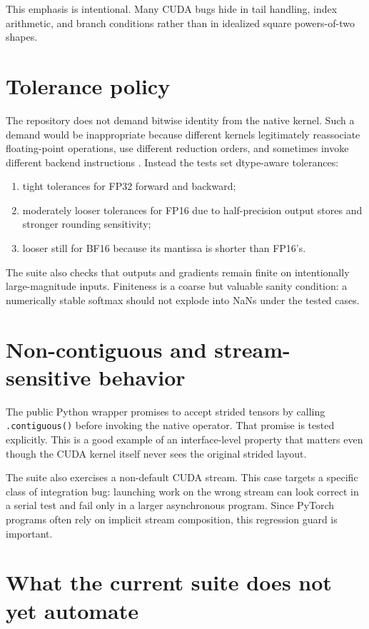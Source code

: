 This emphasis is intentional. Many CUDA bugs hide in tail handling, index arithmetic, and branch conditions rather than in idealized square powers-of-two shapes.

\section{Tolerance policy}

The repository does not demand bitwise identity from the native kernel. Such a demand would be inappropriate because different kernels legitimately reassociate floating-point operations, use different reduction orders, and sometimes invoke different backend instructions \citep{goldberg1991floating,higham2002accuracy,pytorch212numerics}. Instead the tests set dtype-aware tolerances:
\begin{enumerate}
  \item tight tolerances for FP32 forward and backward;
  \item moderately looser tolerances for FP16 due to half-precision output stores and stronger rounding sensitivity;
  \item looser still for BF16 because its mantissa is shorter than FP16's.
\end{enumerate}
The suite also checks that outputs and gradients remain finite on intentionally large-magnitude inputs. Finiteness is a coarse but valuable sanity condition: a numerically stable softmax should not explode into NaNs under the tested cases.

\section{Non-contiguous and stream-sensitive behavior}

The public Python wrapper promises to accept strided tensors by calling \texttt{.contiguous()} before invoking the native operator. That promise is tested explicitly. This is a good example of an interface-level property that matters even though the CUDA kernel itself never sees the original strided layout.

The suite also exercises a non-default CUDA stream. This case targets a specific class of integration bug: launching work on the wrong stream can look correct in a serial test and fail only in a larger asynchronous program. Since PyTorch programs often rely on implicit stream composition, this regression guard is important.

\section{What the current suite does not yet automate}

